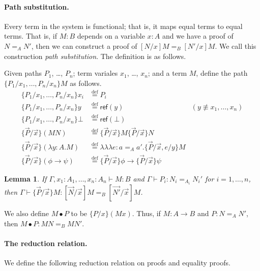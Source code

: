 \documentclass{easychair}
\newcommand{\triplelambda}{\lambda \!\! \lambda \!\! \lambda}
\newcommand{\reff}[1]{\mathsf{ref} \left( {#1} \right)}
\newcommand{\eqdef}{\stackrel{\mathrm{def}}{=}}
\newtheorem{lemma}{Lemma}
\begin{document}
\paragraph{Path substitution.}

Every term in the system is functional; that is, it maps equal terms to equal terms.  That is, if $M : B$ depends on a variable $x : A$ and we have a proof of $N =_A N'$,
then we can construct a proof of $[N/x]M =_B [N'/x]M$.  We call this construction \emph{path substitution}.  The definition is as follows.

Given paths $P_1$, \ldots, $P_n$; term variales $x_1$, \ldots, $x_n$; and a term $M$, define the path $\{ P_1 / x_1, \ldots, P_n / x_n \} M$ as follows.
\begin{align*}
\{ P_1 / x_1, \ldots, P_n / x_n \} x_i & \eqdef P_i \\
\{ P_1 / x_1, \ldots, P_n / x_n \} y & \eqdef \reff{y} & (y \not\equiv x_1, \ldots, x_n) \\
\{ P_1 / x_1, \ldots, P_n / x_n \} \bot & \eqdef \reff{\bot} \\
\{ \vec{P} / \vec{x} \} (MN) & \eqdef \{ \vec{P} / \vec{x} \} M \{ \vec{P} / \vec{x} \} N \\
\{ \vec{P} / \vec{x} \} (\lambda y : A . M) & \eqdef \triplelambda e : a =_A a' . \{ \vec{P} / \vec{x} , e / y \} M \\
\{ \vec{P} / \vec{x} \} (\phi \rightarrow \psi) & \eqdef \{ \vec{P} / \vec{x} \} \phi \rightarrow \{ \vec{P} / \vec{x} \} \psi
\end{align*}

\begin{lemma}
If $\Gamma, x_1 : A_1, \ldots, x_n : A_n \vdash M : B$ and $\Gamma \vdash P_i : N_i =_{A_i} N_i'$ for $i = 1, \ldots, n$, then
$\Gamma \vdash \{ \vec{P} / \vec{x} \} M : [ \vec{N} / \vec{x} ] M =_B [ \vec{N'} / \vec{x} ] M$.
\end{lemma}

We also define $M \bullet P$ to be $\{ P / x \} (Mx)$.  Thus, if $M : A \rightarrow B$ and $P : N =_A N'$, then $M \bullet P : MN =_B MN'$.

\paragraph{The reduction relation.}

We define the following reduction relation on proofs and equality proofs.
\end{document}
